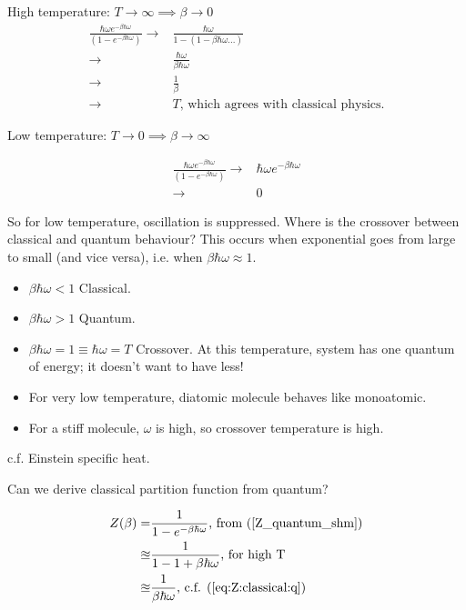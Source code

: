 \documentclass[]{article}
\begin{document}
High temperature: $T\rightarrow\infty \implies \beta \rightarrow 0$
\begin{align*}
	\frac{ \hbar \omega e^{- \beta\hbar \omega}}{(1 - e^{- \beta\hbar \omega})}\rightarrow& \frac{\hbar \omega}{1 -(1 - \beta \hbar \omega...)}\\
	\rightarrow& \frac{\hbar \omega}{\beta \hbar \omega}\\
	\rightarrow& \frac{1}{\beta}\\
	\rightarrow& T\text{, which agrees with classical physics.}
\end{align*}

Low temperature: $T\rightarrow 0 \implies \beta \rightarrow \infty$

\begin{align*}
\frac{ \hbar \omega e^{- \beta\hbar \omega}}{(1 - e^{- \beta\hbar \omega})}\rightarrow&\hbar \omega e^{- \beta\hbar \omega}\\
\rightarrow&0
\end{align*}

So for low temperature, oscillation is suppressed.	Where is the crossover between classical and quantum behaviour? This occurs when exponential goes from large to small (and vice versa), i.e. when $\beta\hbar \omega \approx 1$.

\begin{itemize}
	\item $\beta\hbar \omega < 1$ Classical.
	\item $\beta\hbar \omega > 1$ Quantum.
	\item $\beta\hbar \omega = 1\equiv\hbar \omega=T$ Crossover. At this temperature, system has one quantum of energy; it doesn't want to have less!
	\item For very low temperature, diatomic molecule behaves like monoatomic.
	\item For a stiff molecule, $\omega$ is high, so crossover temperature is high.
\end{itemize}

c.f. Einstein specific heat.

Can we derive classical partition function from quantum?

\begin{align*}
Z(\beta) =&  \frac{1}{1 - e^{- \beta\hbar \omega}} \text{, from (\ref {Z_quantum_shm})}\\
\approxeq & \frac{1}{1 - 1 + \beta\hbar \omega}\text{, for high T}\\
\approxeq & \frac{1}{\beta\hbar \omega}\text{, c.f. (\ref{eq:Z:classical:q})}
\end{align*}
\end{document}
